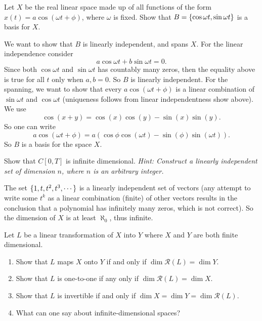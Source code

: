 \begin{problem}
	Let $ X $ be the real linear space made up of all functions of the form $ x(t) = a\cos(\omega t+\phi) $, where $ \omega $ is fixed. Show that $ B=\{\cos\omega t, \sin\omega t\} $ is a basis for $ X $.
\end{problem}
\begin{solution}
	We want to show that $ B $ is linearly independent, and spans $ X $. For the linear independence consider
	\[ a\cos\omega t + b\sin\omega t = 0. \]
	Since both $ \cos\omega t $ and $ \sin\omega t $ has countably many zeros, then the equality above is true for all $ t $ only when $ a,b = 0 $. So $ B $ is linearly independent. 
	For the spanning, we want to show that every $ a\cos(\omega t + \phi) $ is a linear combination of $ \sin\omega t $ and $ \cos\omega t $ (uniqueness follows from linear independentness show above). We use
	\[ \cos(x+y) = \cos(x) \cos(y) - \sin(x) \sin(y). \]
	So one can write
	\[ a\cos(\omega t + \phi) = a(\cos\phi\cos(\omega t) - \sin(\phi)\sin(\omega t)). \]
	So $ B $ is a basis for the space $ X $.
\end{solution}


\begin{problem}
	Show that $ C[0,T] $ is infinite dimensional. \textit{Hint: Construct a linearly independent set of dimension $ n $, where $ n $ is an arbitrary integer.}
\end{problem}
\begin{solution}
	The set $ \{1,t,t^2,t^3,\cdots\} $ is a linearly independent set of vectors (any attempt to write some $ t^k $ as a linear combination (finite) of other vectors results in the conclusion that a polynomial has infinitely many zeros, which is not correct). So the dimension of $ X $ is at least $ \aleph_0 $, thus infinite.
\end{solution}


\begin{problem}
	Let $ L $ be a linear transformation of $ X $ into $ Y $ where $ X $ and $ Y $ are both finite dimensional.
	\begin{enumerate}[a]
		\item Show that $ L $ maps $ X $ onto $ Y $ if and only if $ \dim \mathcal{R}(L) = \dim Y $.
		\item Show that $ L $ is one-to-one if any only if $ \dim \mathcal{R}(L) = \dim X $.
		\item Show that $ L $ is invertible if and only if $ \dim X = \dim Y = \dim \mathcal{R}(L) $.
		\item What can one say about infinite-dimensional spaces?
	\end{enumerate}
	
\end{problem}

